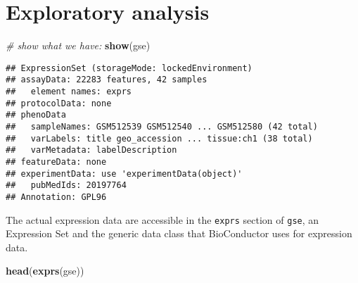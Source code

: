 \documentclass[
]{article}
\newenvironment{Shaded}{\begin{snugshade}}{\end{snugshade}}
\newcommand{\CommentTok}[1]{\textcolor[rgb]{0.56,0.35,0.01}{\textit{#1}}}
\newcommand{\FunctionTok}[1]{\textcolor[rgb]{0.13,0.29,0.53}{\textbf{#1}}}
\newcommand{\NormalTok}[1]{#1}
\begin{document}
\section{Exploratory analysis}\label{exploratory-analysis}

\begin{Shaded}
\begin{Highlighting}[]
\CommentTok{\# show what we have:}
\FunctionTok{show}\NormalTok{(gse)}
\end{Highlighting}
\end{Shaded}

\begin{verbatim}
## ExpressionSet (storageMode: lockedEnvironment)
## assayData: 22283 features, 42 samples 
##   element names: exprs 
## protocolData: none
## phenoData
##   sampleNames: GSM512539 GSM512540 ... GSM512580 (42 total)
##   varLabels: title geo_accession ... tissue:ch1 (38 total)
##   varMetadata: labelDescription
## featureData: none
## experimentData: use 'experimentData(object)'
##   pubMedIds: 20197764 
## Annotation: GPL96
\end{verbatim}

The actual expression data are accessible in the \texttt{exprs} section
of \texttt{gse}, an Expression Set and the generic data class that
BioConductor uses for expression data.

\begin{Shaded}
\begin{Highlighting}[]
\FunctionTok{head}\NormalTok{(}\FunctionTok{exprs}\NormalTok{(gse)) }
\end{Highlighting}
\end{Shaded}
\end{document}
